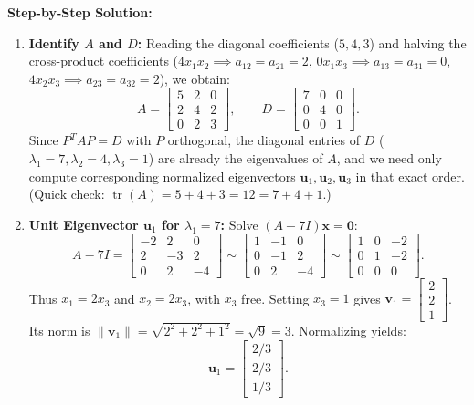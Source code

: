 \documentclass[11pt, letterpaper]{article}
\theoremstyle{definition}
\theoremstyle{remark}
\begin{document}
\textbf{Step-by-Step Solution:}
\begin{enumerate}[leftmargin=2em]
    \item \textbf{Identify $A$ and $D$:}
    Reading the diagonal coefficients ($5, 4, 3$) and halving the cross-product coefficients ($4x_1 x_2 \implies a_{12} = a_{21} = 2$, $0x_1 x_3 \implies a_{13} = a_{31} = 0$, $4x_2 x_3 \implies a_{23} = a_{32} = 2$), we obtain:
    \[
    A = \begin{bmatrix} 5 & 2 & 0 \\ 2 & 4 & 2 \\ 0 & 2 & 3 \end{bmatrix}, \qquad D = \begin{bmatrix} 7 & 0 & 0 \\ 0 & 4 & 0 \\ 0 & 0 & 1 \end{bmatrix}.
    \]
    Since $P^T A P = D$ with $P$ orthogonal, the diagonal entries of $D$ ($\lambda_1 = 7, \lambda_2 = 4, \lambda_3 = 1$) are already the eigenvalues of $A$, and we need only compute corresponding normalized eigenvectors $\mathbf{u}_1, \mathbf{u}_2, \mathbf{u}_3$ in that exact order. (Quick check: $\operatorname{tr}(A) = 5 + 4 + 3 = 12 = 7 + 4 + 1$.)
    \item \textbf{Unit Eigenvector $\mathbf{u}_1$ for $\lambda_1 = 7$:}
    Solve $(A - 7I)\mathbf{x} = \mathbf{0}$:
    \[
    A - 7I = \begin{bmatrix} -2 & 2 & 0 \\ 2 & -3 & 2 \\ 0 & 2 & -4 \end{bmatrix} \sim \begin{bmatrix} 1 & -1 & 0 \\ 0 & -1 & 2 \\ 0 & 2 & -4 \end{bmatrix} \sim \begin{bmatrix} 1 & 0 & -2 \\ 0 & 1 & -2 \\ 0 & 0 & 0 \end{bmatrix}.
    \]
    Thus $x_1 = 2x_3$ and $x_2 = 2x_3$, with $x_3$ free. Setting $x_3 = 1$ gives $\mathbf{v}_1 = \begin{bmatrix} 2 \\ 2 \\ 1 \end{bmatrix}$. Its norm is $\|\mathbf{v}_1\| = \sqrt{2^2 + 2^2 + 1^2} = \sqrt{9} = 3$. Normalizing yields:
    \[
    \mathbf{u}_1 = \begin{bmatrix} 2/3 \\ 2/3 \\ 1/3 \end{bmatrix}.
\]
\end{enumerate}
\end{document}
